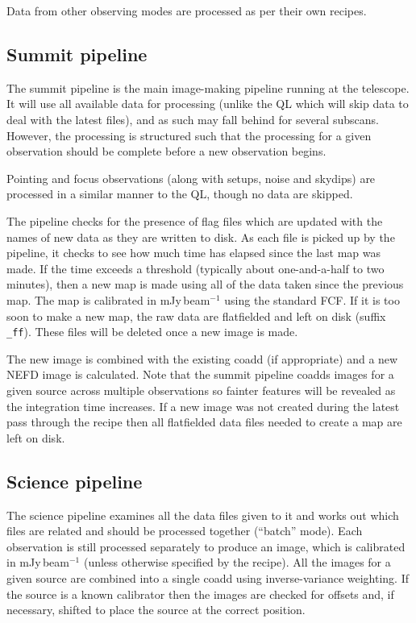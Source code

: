 Data from other observing modes are processed as per their own recipes.

\subsection{Summit pipeline}

The summit pipeline is the main image-making pipeline running at the
telescope. It will use all available data for processing (unlike the
QL which will skip data to deal with the latest files), and as such
may fall behind for several subscans. However, the processing is
structured such that the processing for a given observation should be
complete before a new observation begins.

Pointing and focus observations (along with setups, noise and skydips)
are processed in a similar manner to the QL, though no data are
skipped.

The pipeline checks for the presence of flag files which are updated
with the names of new data as they are written to disk. As each file
is picked up by the pipeline, it checks to see how much time has
elapsed since the last map was made. If the time exceeds a threshold
(typically about one-and-a-half to two minutes), then a new map is
made using all of the data taken since the previous map. The map is
calibrated in mJy\,beam$^{-1}$ using the standard FCF. If it is too
soon to make a new map, the raw data are flatfielded and left on disk
(suffix \verb+_ff+). These files will be deleted once a new image is
made.

The new image is combined with the existing coadd (if appropriate) and
a new NEFD image is calculated. Note that the summit pipeline coadds
images for a given source across multiple observations so fainter
features will be revealed as the integration time increases. If a new
image was not created during the latest pass through the recipe then
all flatfielded data files needed to create a map are left on disk.

\subsection{Science pipeline}

The science pipeline examines all the data files given to it and works
out which files are related and should be processed together
(``batch'' mode). Each observation is still processed separately to
produce an image, which is calibrated in mJy\,beam$^{-1}$ (unless
otherwise specified by the recipe). All the images for a given source
are combined into a single coadd using inverse-variance weighting. If
the source is a known calibrator then the images are checked for
offsets and, if necessary, shifted to place the source at the correct
position.

